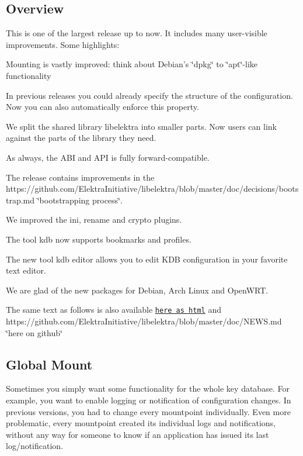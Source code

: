 \subsection*{Overview}

This is one of the largest release up to now. It includes many user-\/visible improvements. Some highlights\+:


\begin{DoxyItemize}
\item Mounting is vastly improved\+: think about Debian's \char`\"{}dpkg\char`\"{} to \char`\"{}apt\char`\"{}-\/like functionality
\item In previous releases you could already specify the structure of the configuration. Now you can also automatically enforce this property.
\item We split the shared library {\ttfamily libelektra} into smaller parts. Now users can link against the parts of the library they need.
\item As always, the A\+B\+I and A\+P\+I is fully forward-\/compatible.
\item The release contains improvements in the https\+://github.com/\+Elektra\+Initiative/libelektra/blob/master/doc/decisions/bootstrap.\+md \char`\"{}bootstrapping process\char`\"{}.
\item We improved the {\ttfamily ini}, {\ttfamily rename} and {\ttfamily crypto} plugins.
\item The tool {\ttfamily kdb} now supports bookmarks and profiles.
\item The new tool {\ttfamily kdb editor} allows you to edit K\+D\+B configuration in your favorite text editor.
\item We are glad of the new packages for Debian, Arch Linux and Open\+W\+R\+T.
\end{DoxyItemize}

The same text as follows is also available \href{http://doc.libelektra.org/news/1ab4a560-c286-46d2-a058-1a8e7e208fe8.html}{\tt here as html} and https\+://github.com/\+Elektra\+Initiative/libelektra/blob/master/doc/\+N\+E\+W\+S.\+md \char`\"{}here on github\char`\"{}

\subsection*{Global Mount}

Sometimes you simply want some functionality for the whole key database. For example, you want to enable logging or notification of configuration changes. In previous versions, you had to change every mountpoint individually. Even more problematic, every mountpoint created its individual logs and notifications, without any way for someone to know if an application has issued its last log/notification.

